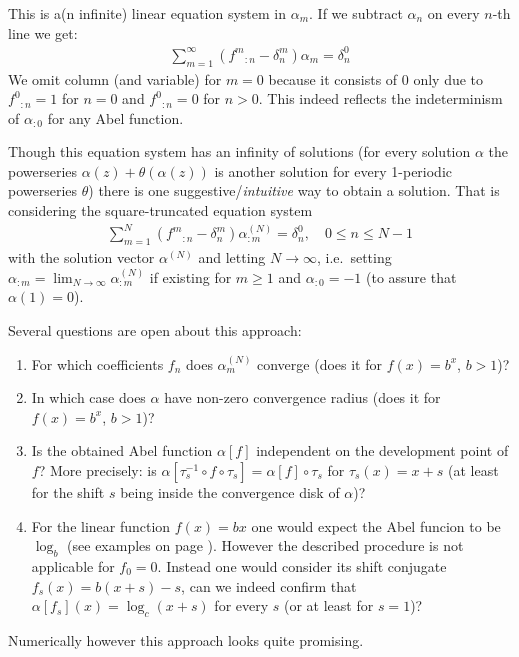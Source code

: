 \documentclass{article}
\numberwithin{equation}{section}
\begin{document}
This is a(n infinite) linear equation system in $\alpha_m$. If we subtract
$\alpha_n$ on every $n$-th line we get:
\begin{align*}
  \sum_{m=1}^\infty \left({f^m}_{:n}-\delta^m_n\right) \alpha_m =
  \delta^0_n%
\end{align*}
We omit column (and variable) for $m=0$ because it consists of
0 only due to ${f^0}_{:n}=1$ for $n=0$ and ${f^0}_{:n}=0$ for $n>0$. This 
indeed reflects the indeterminism of $\alpha_{:0}$ for any Abel function.

Though this equation system has an infinity of solutions (for every
solution $\alpha$ the powerseries $\alpha(z)+\theta(\alpha(z))$ is
another solution for every 1-periodic powerseries $\theta$) there is
one suggestive/{\em intuitive} way to obtain a solution. That is
considering the square-truncated equation system
\begin{align*}
  \sum_{m=1}^N \left({f^m}_{:n}-\delta^m_n\right) \alpha^{(N)}_{:m} =
  \delta^0_n, \quad 0\le n\le N-1
\end{align*}
with the solution vector $\alpha^{(N)}$ and letting $N\to\infty$, i.e.\
setting $\alpha_{:m} = \lim_{N\to\infty} \alpha^{(N)}_{:m}$ if existing for
$m\ge 1$ and $\alpha_{:0} = -1$ (to assure that $\alpha(1)=0$).

Several questions are open about this approach:
\begin{enumerate}
\item For which coefficients $f_n$ does $\alpha^{(N)}_m$ converge
  (does it for $f(x)=b^x$, $b>1$)?
\item In which case does $\alpha$ have non-zero convergence radius
  (does it for $f(x)=b^x$, $b>1$)?
\item \label{item:intuitive_devpoint_indep} Is the obtained Abel function $\alpha[f]$ independent on the
  development point of $f$? More precisely: is
  $\alpha[\tau_s^{-1}\circ f\circ\tau_s]=\alpha[f]\circ \tau_s$ for
  $\tau_s(x)=x+s$ (at least for the shift $s$ being inside the convergence
  disk of $\alpha$)? 
\item For the linear function $f(x)=bx$ one would expect the Abel
  funcion to be $\log_b$ (see examples on page
  \pageref{example:log}). However the described procedure is not
  applicable for $f_0=0$. Instead one would consider its shift
  conjugate $f_s(x)=b(x+s)-s$, can we indeed confirm that
  $\alpha[f_s](x)=\log_c(x+s)$ for every $s$ (or at least
  for $s=1$)?
\end{enumerate}
Numerically however this approach looks quite promising.
\end{document}
